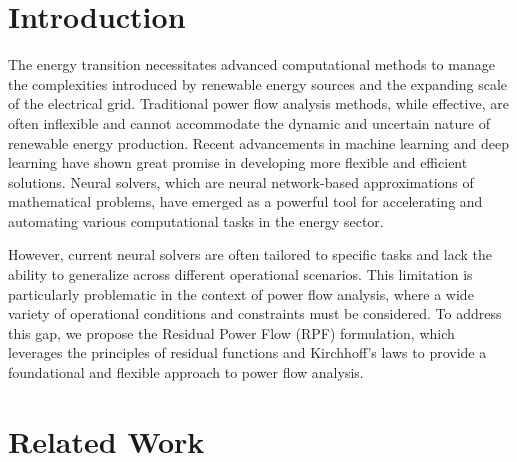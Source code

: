 \section{Introduction}

The energy transition necessitates advanced computational methods to manage the complexities introduced by renewable energy sources and the expanding scale of the electrical grid. Traditional power flow analysis methods, while effective, are often inflexible and cannot accommodate the dynamic and uncertain nature of renewable energy production. Recent advancements in machine learning and deep learning have shown great promise in developing more flexible and efficient solutions. Neural solvers, which are neural network-based approximations of mathematical problems, have emerged as a powerful tool for accelerating and automating various computational tasks in the energy sector.

However, current neural solvers are often tailored to specific tasks and lack the ability to generalize across different operational scenarios. This limitation is particularly problematic in the context of power flow analysis, where a wide variety of operational conditions and constraints must be considered. To address this gap, we propose the Residual Power Flow (RPF) formulation, which leverages the principles of residual functions and Kirchhoff's laws to provide a foundational and flexible approach to power flow analysis.

\section{Related Work}


